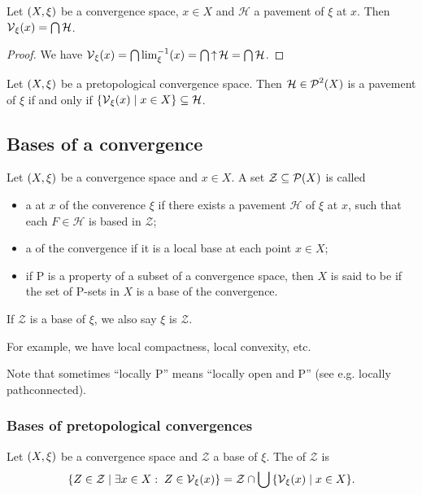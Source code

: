\begin{lemma} \label{vicinityMeetOfPavement}
Let $\sSet{X,\xi}$ be a convergence space, $x\in X$ and $\mathcal{H}$ a pavement of $\xi$ at $x$. Then $\operatorname{\mathcal{V}}_\xi(x) = \bigcap\mathcal{H}$.
\end{lemma}
\begin{proof}
We have $\operatorname{\mathcal{V}}_\xi(x) = \bigcap\lim^{-1}_{\xi}(x) = \bigcap\operatorname{\uparrow}\mathcal{H} = \bigcap\mathcal{H}$.
\end{proof}

\begin{lemma}
Let $\sSet{X,\xi}$ be a pretopological convergence space. Then $\mathcal{H}\in\operatorname{\mathcal{P}}^2(X)$ is a pavement of $\xi$ \textup{if and only if} $\setbuilder{\vicinities_\xi(x)}{x\in X} \subseteq \mathcal{H}$.
\end{lemma}

\subsection{Bases of a convergence}
\begin{definition}
Let $\sSet{X,\xi}$ be a convergence space and $x\in X$. A set $\mathcal{Z}\subseteq \operatorname{\mathcal{P}}(X)$ is called
\begin{itemize}
\item a  at $x$ of the converence $\xi$ if there exists a pavement $\mathcal{H}$ of $\xi$ at $x$, such that each $F\in\mathcal{H}$ is based in $\mathcal{Z}$;
\item a  of the convergence if it is a local base at each point $x\in X$;
\item if $\mathrm{P}$ is a property of a subset of a convergence space, then $X$ is said to be  if the set of $\mathrm{P}$-sets in $X$ is a base of the convergence. 
\end{itemize}
If $\mathcal{Z}$ is a base of $\xi$, we also say $\xi$ is  $\mathcal{Z}$.
\end{definition}
For example, we have local compactness, local convexity, etc.

Note that sometimes ``locally $\mathrm{P}$'' means ``locally open and $\mathrm{P}$'' (see e.g. locally pathconnected).  

\subsubsection{Bases of pretopological convergences}
\begin{definition}
Let $\sSet{X,\xi}$ be a convergence space and $\mathcal{Z}$ a base of $\xi$. The  of $\mathcal{Z}$ is
\[ \setbuilder{Z\in \mathcal{Z}}{\exists x\in X: \; Z\in \vicinities_\xi(x)} = \mathcal{Z}\cap \bigcup\setbuilder{\vicinities_\xi(x)}{x\in X}. \]
\end{definition}

